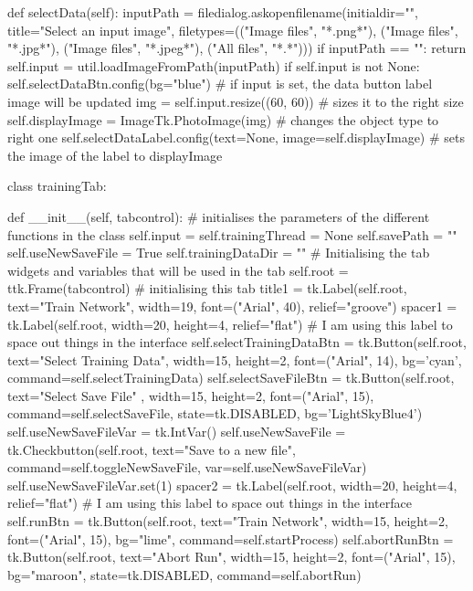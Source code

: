 \documentclass{report}
\begin{document}
\begin{python}
    def selectData(self):
        inputPath = filedialog.askopenfilename(initialdir="", title="Select an input image",
                             filetypes=(("Image files", "*.png*"),
                             ("Image files", "*.jpg*"), ("Image files", "*.jpeg*"),
                             ("All files", "*.*")))
        if inputPath == "":
            return
        self.input = util.loadImageFromPath(inputPath)
        if self.input is not None:
            self.selectDataBtn.config(bg="blue")
            #  if input is set, the data button label image will be updated
            img = self.input.resize((60, 60))  # sizes it to the right size
            self.displayImage = ImageTk.PhotoImage(img)  # changes the object type to right one
            self.selectDataLabel.config(text=None, image=self.displayImage)  # sets the image of the label to displayImage


class trainingTab:

    def __init__(self, tabcontrol):
        # initialises the parameters of the different functions in the class
        self.input = self.trainingThread = None
        self.savePath = ""
        self.useNewSaveFile = True
        self.trainingDataDir = ""
        # Initialising the tab widgets and variables that will be used in the tab
        self.root = ttk.Frame(tabcontrol)  # initialising this tab
        title1 = tk.Label(self.root, text="Train Network", width=19,
                            font=("Arial", 40), relief="groove")
        spacer1 = tk.Label(self.root, width=20, height=4,
                            relief="flat")  # I am using this label to space out things in the interface
        self.selectTrainingDataBtn = tk.Button(self.root, text="Select Training Data",
                            width=15, height=2, font=("Arial", 14),
                            bg='cyan', command=self.selectTrainingData)
        self.selectSaveFileBtn = tk.Button(self.root, text="Select Save File"
                                , width=15, height=2, font=("Arial", 15),
                                command=self.selectSaveFile,
                                state=tk.DISABLED,
                                bg='LightSkyBlue4')
        self.useNewSaveFileVar = tk.IntVar()
        self.useNewSaveFile = tk.Checkbutton(self.root,
                                text="Save to a new file",
                                command=self.toggleNewSaveFile,
                                var=self.useNewSaveFileVar)
        self.useNewSaveFileVar.set(1)
        spacer2 = tk.Label(self.root, width=20, height=4,
                           relief="flat")  # I am using this label to space out things in the interface
        self.runBtn = tk.Button(self.root, text="Train Network", width=15, height=2,
                                font=("Arial", 15), bg="lime",
                                command=self.startProcess)
        self.abortRunBtn = tk.Button(self.root, text="Abort Run", width=15,
                                height=2, font=("Arial", 15),
                                bg="maroon", state=tk.DISABLED,
                                command=self.abortRun)


\end{python}
\end{document}

